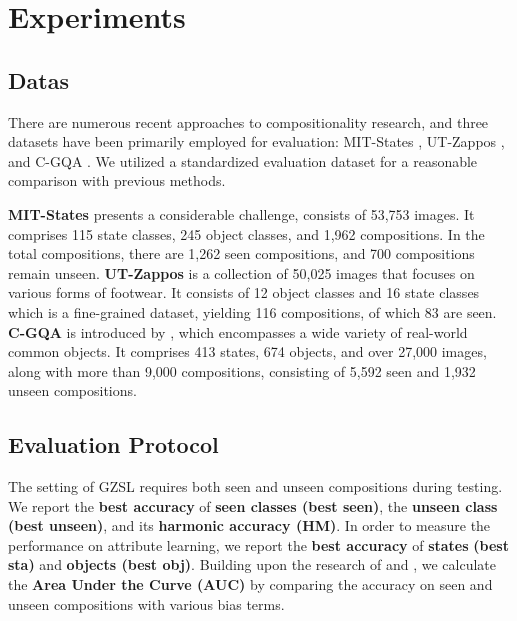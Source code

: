 \documentclass[letterpaper]{article} %
\theoremstyle{definition}
\begin{document}
\section{Experiments} \label{sec.experiments}
\subsection{Datas\label{subsec.datasets}}
There are numerous recent approaches to compositionality research, and three datasets have been primarily employed for evaluation: MIT-States \cite{mit}, UT-Zappos \cite{utzappos}, and C-GQA \cite{naeem2021learning}. We utilized a standardized evaluation dataset for a reasonable comparison with previous methods.

\textbf{MIT-States} presents a considerable challenge, consists of 53,753 images. It comprises 115 state classes, 245 object classes, and 1,962 compositions. In the total compositions, there are 1,262 seen compositions, and 700 compositions remain unseen. \textbf{UT-Zappos} is a collection of 50,025 images that focuses on various forms of footwear. It consists of 12 object classes and 16 state classes which is a fine-grained dataset, yielding 116 compositions, of which 83 are seen. \textbf{C-GQA} is introduced by \citet{naeem2021learning}, which encompasses a wide variety of real-world common objects. It comprises 413 states, 674 objects, and over 27,000 images, along with more than 9,000 compositions, consisting of 5,592 seen and 1,932 unseen compositions.

\subsection{Evaluation Protocol} \label{subsec.metrics}
The setting of GZSL \cite{xian2017zero} requires both seen and unseen compositions during testing. We report the \textbf{best accuracy} of \textbf{seen classes (best seen)}, the \textbf{unseen class (best unseen)}, and its \textbf{harmonic accuracy (HM)}. In order to measure the performance on attribute learning, we report the \textbf{best accuracy} of \textbf{states} \textbf{(best sta)} and \textbf{objects (best obj)}. Building upon the research of \cite{naeem2021learning} and \cite{wang2019task}, we calculate the \textbf{Area Under the Curve (AUC)} by comparing the accuracy on seen and unseen compositions with various bias terms. 
\end{document}
